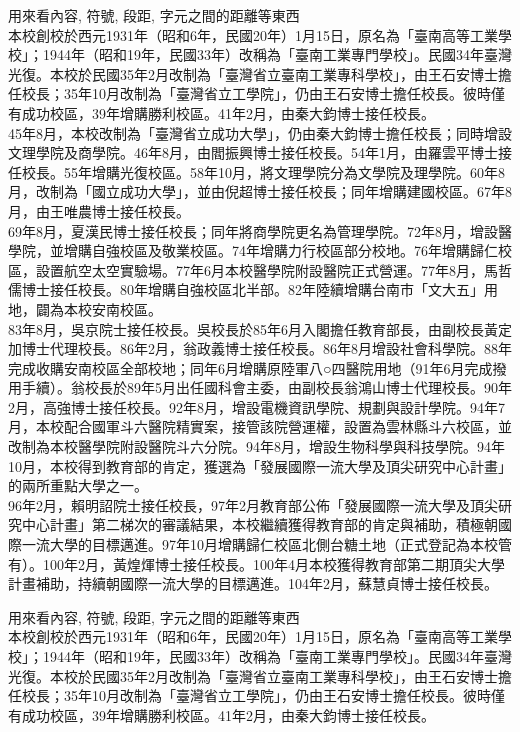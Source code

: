 \newpage
{}
用來看內容, 符號, 段距, 字元之間的距離等東西\\

本校創校於西元1931年（昭和6年，民國20年）1月15日，原名為「臺南高等工業學校」；1944年（昭和19年，民國33年）改稱為「臺南工業專門學校」。民國34年臺灣光復。本校於民國35年2月改制為「臺灣省立臺南工業專科學校」，由王石安博士擔任校長；35年10月改制為「臺灣省立工學院」，仍由王石安博士擔任校長。彼時僅有成功校區，39年增購勝利校區。41年2月，由秦大鈞博士接任校長。\\
45年8月，本校改制為「臺灣省立成功大學」，仍由秦大鈞博士擔任校長；同時增設文理學院及商學院。46年8月，由閻振興博士接任校長。54年1月，由羅雲平博士接任校長。55年增購光復校區。58年10月，將文理學院分為文學院及理學院。60年8月，改制為「國立成功大學」，並由倪超博士接任校長；同年增購建國校區。67年8月，由王唯農博士接任校長。\\
69年8月，夏漢民博士接任校長；同年將商學院更名為管理學院。72年8月，增設醫學院，並增購自強校區及敬業校區。74年增購力行校區部分校地。76年增購歸仁校區，設置航空太空實驗場。77年6月本校醫學院附設醫院正式營運。77年8月，馬哲儒博士接任校長。80年增購自強校區北半部。82年陸續增購台南市「文大五」用地，闢為本校安南校區。\\
83年8月，吳京院士接任校長。吳校長於85年6月入閣擔任教育部長，由副校長黃定加博士代理校長。86年2月，翁政義博士接任校長。86年8月增設社會科學院。88年完成收購安南校區全部校地；同年6月增購原陸軍八○四醫院用地（91年6月完成撥用手續）。翁校長於89年5月出任國科會主委，由副校長翁鴻山博士代理校長。90年2月，高強博士接任校長。92年8月，增設電機資訊學院、規劃與設計學院。94年7月，本校配合國軍斗六醫院精實案，接管該院營運權，設置為雲林縣斗六校區，並改制為本校醫學院附設醫院斗六分院。94年8月，增設生物科學與科技學院。94年10月，本校得到教育部的肯定，獲選為「發展國際一流大學及頂尖研究中心計畫」的兩所重點大學之一。\\
96年2月，賴明詔院士接任校長，97年2月教育部公佈「發展國際一流大學及頂尖研究中心計畫」第二梯次的審議結果，本校繼續獲得教育部的肯定與補助，積極朝國際一流大學的目標邁進。97年10月增購歸仁校區北側台糖土地（正式登記為本校管有）。100年2月，黃煌煇博士接任校長。100年4月本校獲得教育部第二期頂尖大學計畫補助，持續朝國際一流大學的目標邁進。104年2月，蘇慧貞博士接任校長。


\newpage
{}
用來看內容, 符號, 段距, 字元之間的距離等東西\\

本校創校於西元1931年（昭和6年，民國20年）1月15日，原名為「臺南高等工業學校」；1944年（昭和19年，民國33年）改稱為「臺南工業專門學校」。民國34年臺灣光復。本校於民國35年2月改制為「臺灣省立臺南工業專科學校」，由王石安博士擔任校長；35年10月改制為「臺灣省立工學院」，仍由王石安博士擔任校長。彼時僅有成功校區，39年增購勝利校區。41年2月，由秦大鈞博士接任校長。\\

